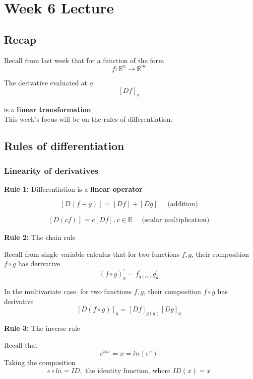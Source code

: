 \chapter{Week 6 Lecture}

\section{Recap}

Recall from last week that for a function of the form \[
   f: \mathbb{R}^n \to \mathbb{R}^m
\] 

The derivative evaluated at $ \underline{a}$ \[
  \left[ D f \right]_{ \underline{a}} 
\] 

is a \textbf{linear transformation} \\

This week's focus will be on the rules of differentiation. \\

\section{Rules of differentiation}

\subsection{Linearity of derivatives}

\textbf{Rule 1:} Differentiation is a \textbf{linear operator}

\[
   \left[ D (f + g) \right]_{}  = \left[ D f \right]_{} + \left[ D g \right]_{}  \quad \text{ (addition)}
\] 

\[
   \left[ D (cf) \right]_{}  = c\left[ D f \right]_{}, c \in \mathbb{R} \quad \text{ (scalar multiplication)}
\] 

\textbf{Rule 2:} The chain rule

Recall from single variable calculus that for two functions $f, g$, their composition $f \circ g$ has derivative \[
   (f \circ g) ^{\prime}_{a} = f_{g(a)} ^{\prime} g_{a}^{\prime}
\] 

In the multivariate case, for two functions $f, g$, their composition $ f \circ g$ has derivative
\[
 \left[ D (f \circ g) \right]_{ \underline{a}}  = \left[ D f \right]_{g( \underline{a})}  \left[ D g \right]_{ \underline{a}}  
\] 

\textbf{Rule 3:} The inverse rule

Recall that \[
   e^{lnx} = x = ln(e^x)
\] 
Taking the composition
\[
   e \circ ln = ID, \text{ the identity function, where } ID(x) = x
\] 

